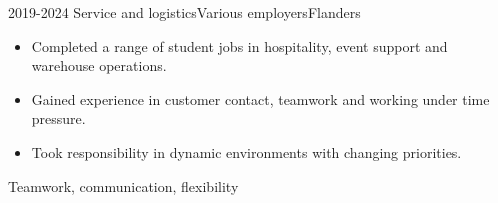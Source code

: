 \begin{experience}
    \experienceentry
    {2019-2024}
    {Service and logistics}{Various employers}{Flanders}
    {}
    {
        \begin{itemize}
            \item Completed a range of student jobs in hospitality, event support and warehouse operations.
            \item Gained experience in customer contact, teamwork and working under time pressure.
            \item Took responsibility in dynamic environments with changing priorities.
        \end{itemize}
    }
    {Teamwork, communication, flexibility}
\end{experience}
